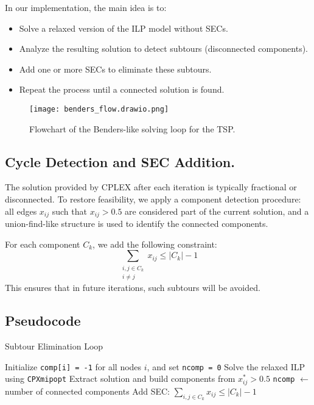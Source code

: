 In our implementation, the main idea is to:
\begin{itemize}
    \item Solve a relaxed version of the ILP model without SECs.
    \item Analyze the resulting solution to detect subtours (disconnected components).
    \item Add one or more SECs to eliminate these subtours.
    \item Repeat the process until a connected solution is found.
\end{itemize}

\begin{figure}[H]
    \centering
    \texttt{[image: benders\_flow.drawio.png]}
    \caption{Flowchart of the Benders-like solving loop for the TSP.}
    \label{fig:benders_flowchart}
\end{figure}

\subsection{Cycle Detection and SEC Addition.}
The solution provided by CPLEX after each iteration is typically fractional or disconnected. To restore feasibility, we apply a component detection procedure: all edges \( x_{ij} \) such that \( x_{ij} > 0.5 \) are considered part of the current solution, and a union-find-like structure is used to identify the connected components.

For each component \( C_k \), we add the following constraint:
\[
\sum_{\substack{i,j \in C_k \\ i \neq j}} x_{ij} \leq |C_k| - 1
\]
This ensures that in future iterations, such subtours will be avoided.

\subsection{Pseudocode}
\begin{algorithm}[H]
\caption{Subtour Elimination Loop}
\begin{algorithmic}[1]
\State Initialize \texttt{comp[i] = -1} for all nodes $i$, and set \texttt{ncomp = 0}
\Repeat
    \State Solve the relaxed ILP using \texttt{CPXmipopt}
    \State Extract solution and build components from $x^*_{ij} > 0.5$
    \State \texttt{ncomp} $\gets$ number of connected components
            \State Add SEC: $\sum_{i,j \in C_k} x_{ij} \leq |C_k| - 1$
        \EndFor
    \EndIf
{}
\end{algorithmic}
\end{algorithm}

